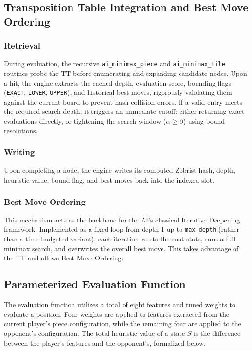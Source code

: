 \subsection{Transposition Table Integration and Best Move Ordering} \label{sec:tt_integration}
\subsubsection{Retrieval}
During evaluation, the recursive \texttt{ai\_minimax\_piece} and \texttt{ai\_minimax\_tile} routines probe the TT before enumerating and expanding candidate nodes. Upon a hit, the engine extracts the cached depth, evaluation score, bounding flags (\texttt{EXACT}, \texttt{LOWER}, \texttt{UPPER}), and historical best moves, rigorously validating them against the current board to prevent hash collision errors. If a valid entry meets the required search depth, it triggers an immediate cutoff: either returning exact evaluations directly, or tightening the search window ($\alpha \geq \beta$) using bound resolutions.

\subsubsection{Writing}
Upon completing a node, the engine writes its computed Zobrist hash, depth, heuristic value, bound flag, and best moves back into the indexed slot.

\subsubsection{Best Move Ordering}
This mechanism acts as the backbone for the AI's classical Iterative Deepening framework. Implemented as a fixed loop from depth 1 up to \texttt{max\_depth} (rather than a time-budgeted variant), each iteration resets the root state, runs a full minimax search, and overwrites the overall best move. This takes advantage of the TT and allows Best Move Ordering.

\subsection{Parameterized Evaluation Function}
The evaluation function utilizes a total of eight features and tuned weights to evaluate a position. Four weights are applied to features extracted from the current player's piece configuration, while the remaining four are applied to the opponent's configuration. The total heuristic value of a state $S$ is the difference between the player's features and the opponent's, formalized below.




